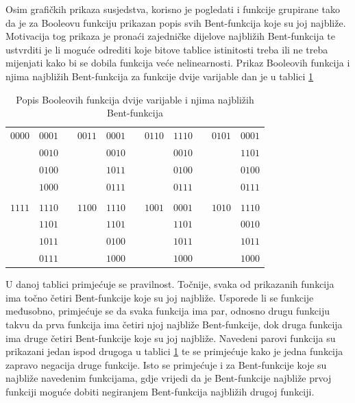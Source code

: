 Osim grafičkih prikaza susjedstva, korisno je pogledati i funkcije grupirane tako da je za Booleovu funkciju prikazan popis svih Bent-funkcija koje su joj najbliže.
Motivacija tog prikaza je pronaći zajedničke dijelove najbližih Bent-funkcija te ustvrditi je li moguće odrediti koje bitove tablice istinitosti treba ili ne treba mijenjati kako bi se dobila funkcija veće nelinearnosti.
Prikaz Booleovih funkcija i njima najbližih Bent-funkcija za funkcije dvije varijable dan je u tablici \ref{tbl:neighbor}
\begin{table}[]
\centering
\caption{Popis Booleovih funkcija dvije varijable i njima najbližih Bent-funkcija}
\begin{tabular}{ccccccccccc}
$0000$ & $0001$ &  & $0011$ & $0001$ &  & $0110$ & $1110$ &  & $0101$ & $0001$ \\
       & $0010$ &  &        & $0010$ &  &        & $0010$ &  &        & $1101$ \\
       & $0100$ &  &        & $1011$ &  &        & $0100$ &  &        & $0100$ \\
       & $1000$ &  &        & $0111$ &  &        & $0111$ &  &        & $0111$ \\
       &        &  &        &        &  &        &        &  &        &        \\
$1111$ & $1110$ &  & $1100$ & $1110$ &  & $1001$ & $0001$ &  & $1010$ & $1110$ \\
       & $1101$ &  &        & $1101$ &  &        & $1101$ &  &        & $0010$ \\
       & $1011$ &  &        & $0100$ &  &        & $1011$ &  &        & $1011$ \\
       & $0111$ &  &        & $1000$ &  &        & $1000$ &  &        & $1000$ \\
\end{tabular}
\label{tbl:neighbor}
\end{table}
U danoj tablici primjećuje se pravilnost.
Točnije, svaka od prikazanih funkcija ima točno četiri Bent-funkcije koje su joj najbliže.
Usporede li se funkcije međusobno, primjećuje se da svaka funkcija ima par, odnosno drugu funkciju takvu da prva funkcija ima četiri njoj najbliže Bent-funkcije, dok druga funkcija ima druge četiri Bent-funkcije koje su joj najbliže.
Navedeni parovi funkcija su prikazani jedan ispod drugoga u tablici \ref{tbl:neighbor} te se primjećuje kako je jedna funkcija zapravo negacija druge funkcije.
Isto se primjećuje i za Bent-funkcije koje su najbliže navedenim funkcijama, gdje vrijedi da je Bent-funkcije najbliže prvoj funkciji moguće dobiti negiranjem Bent-funkcija najbližih drugoj funkciji.
